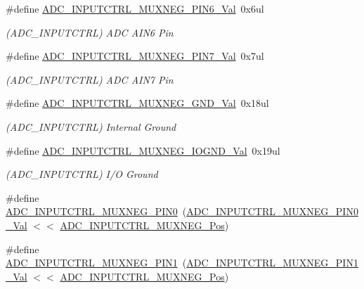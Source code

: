 \begin{DoxyCompactItemize}
\#define \mbox{\hyperlink{group___s_a_m_d21___a_d_c_ga91db26a404da4d2983a37408f80841c9}{A\+D\+C\+\_\+\+I\+N\+P\+U\+T\+C\+T\+R\+L\+\_\+\+M\+U\+X\+N\+E\+G\+\_\+\+P\+I\+N6\+\_\+\+Val}}~0x6ul
\begin{DoxyCompactList}\small\item\em (A\+D\+C\+\_\+\+I\+N\+P\+U\+T\+C\+T\+RL) A\+DC A\+I\+N6 Pin \end{DoxyCompactList}\item 
\#define \mbox{\hyperlink{group___s_a_m_d21___a_d_c_ga66909748260aeabe8304e72fc05aa2fe}{A\+D\+C\+\_\+\+I\+N\+P\+U\+T\+C\+T\+R\+L\+\_\+\+M\+U\+X\+N\+E\+G\+\_\+\+P\+I\+N7\+\_\+\+Val}}~0x7ul
\begin{DoxyCompactList}\small\item\em (A\+D\+C\+\_\+\+I\+N\+P\+U\+T\+C\+T\+RL) A\+DC A\+I\+N7 Pin \end{DoxyCompactList}\item 
\#define \mbox{\hyperlink{group___s_a_m_d21___a_d_c_gae6ea3ff05c2eb05f70ec06ee544fe1d1}{A\+D\+C\+\_\+\+I\+N\+P\+U\+T\+C\+T\+R\+L\+\_\+\+M\+U\+X\+N\+E\+G\+\_\+\+G\+N\+D\+\_\+\+Val}}~0x18ul
\begin{DoxyCompactList}\small\item\em (A\+D\+C\+\_\+\+I\+N\+P\+U\+T\+C\+T\+RL) Internal Ground \end{DoxyCompactList}\item 
\#define \mbox{\hyperlink{group___s_a_m_d21___a_d_c_ga18448559bcccc179110e51ed9f2a9387}{A\+D\+C\+\_\+\+I\+N\+P\+U\+T\+C\+T\+R\+L\+\_\+\+M\+U\+X\+N\+E\+G\+\_\+\+I\+O\+G\+N\+D\+\_\+\+Val}}~0x19ul
\begin{DoxyCompactList}\small\item\em (A\+D\+C\+\_\+\+I\+N\+P\+U\+T\+C\+T\+RL) I/O Ground \end{DoxyCompactList}\item 
\#define \mbox{\hyperlink{group___s_a_m_d21___a_d_c_ga0829abe4ff16bf53c0d11a047112c91f}{A\+D\+C\+\_\+\+I\+N\+P\+U\+T\+C\+T\+R\+L\+\_\+\+M\+U\+X\+N\+E\+G\+\_\+\+P\+I\+N0}}~(\mbox{\hyperlink{group___s_a_m_d21___a_d_c_ga9d910c6ba24bd46e46c9b4a20ed48fb0}{A\+D\+C\+\_\+\+I\+N\+P\+U\+T\+C\+T\+R\+L\+\_\+\+M\+U\+X\+N\+E\+G\+\_\+\+P\+I\+N0\+\_\+\+Val}} $<$$<$ \mbox{\hyperlink{group___s_a_m_d21___a_d_c_ga47f933ef105812dd56ccffab8f7a0877}{A\+D\+C\+\_\+\+I\+N\+P\+U\+T\+C\+T\+R\+L\+\_\+\+M\+U\+X\+N\+E\+G\+\_\+\+Pos}})
\item 
\#define \mbox{\hyperlink{group___s_a_m_d21___a_d_c_gab825ce52184ffae6e0c6ada25be6548c}{A\+D\+C\+\_\+\+I\+N\+P\+U\+T\+C\+T\+R\+L\+\_\+\+M\+U\+X\+N\+E\+G\+\_\+\+P\+I\+N1}}~(\mbox{\hyperlink{group___s_a_m_d21___a_d_c_gac312c379eda7c03b413687c7e26e6b94}{A\+D\+C\+\_\+\+I\+N\+P\+U\+T\+C\+T\+R\+L\+\_\+\+M\+U\+X\+N\+E\+G\+\_\+\+P\+I\+N1\+\_\+\+Val}} $<$$<$ \mbox{\hyperlink{group___s_a_m_d21___a_d_c_ga47f933ef105812dd56ccffab8f7a0877}{A\+D\+C\+\_\+\+I\+N\+P\+U\+T\+C\+T\+R\+L\+\_\+\+M\+U\+X\+N\+E\+G\+\_\+\+Pos}})

\end{DoxyCompactItemize}
